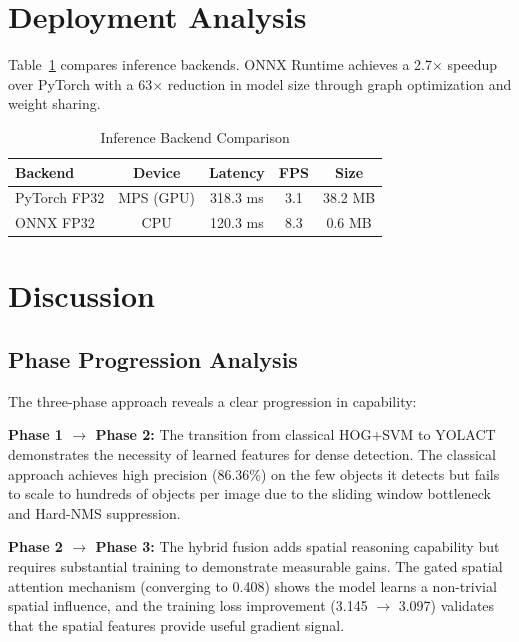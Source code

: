\documentclass[conference]{IEEEtran}
\begin{document}
\section{Deployment Analysis}
\label{sec:deployment}

Table~\ref{tab:deployment} compares inference backends. ONNX Runtime achieves
a 2.7$\times$ speedup over PyTorch with a 63$\times$ reduction in model size
through graph optimization and weight sharing.

\begin{table}[t]
  \centering
  \caption{Inference Backend Comparison}
  \label{tab:deployment}
  \begin{tabular}{lcccc}
    \toprule
    \textbf{Backend} & \textbf{Device} & \textbf{Latency} & \textbf{FPS} &
    \textbf{Size} \\
    \midrule
    PyTorch FP32 & MPS (GPU) & 318.3 ms & 3.1 & 38.2 MB \\
    ONNX FP32    & CPU       & 120.3 ms & 8.3 & 0.6 MB \\
    \bottomrule
  \end{tabular}
\end{table}

\section{Discussion}
\label{sec:discussion}

\subsection{Phase Progression Analysis}

The three-phase approach reveals a clear progression in capability:

\textbf{Phase 1 $\to$ Phase 2:} The transition from classical HOG+SVM to
YOLACT demonstrates the necessity of learned features for dense detection. The
classical approach achieves high precision (86.36\%) on the few objects it
detects but fails to scale to hundreds of objects per image due to the sliding
window bottleneck and Hard-NMS suppression.

\textbf{Phase 2 $\to$ Phase 3:} The hybrid fusion adds spatial reasoning
capability but requires substantial training to demonstrate measurable gains.
The gated spatial attention mechanism (converging to 0.408) shows the model
learns a non-trivial spatial influence, and the training loss improvement
(3.145 $\to$ 3.097) validates that the spatial features provide useful
gradient signal.
\end{document}
